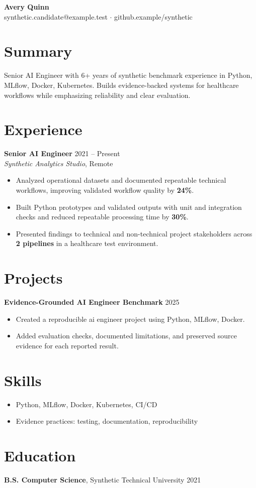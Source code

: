 \documentclass[10pt,letterpaper]{article}
\begin{document}
\begin{center}
{\Large \textbf{Avery Quinn}}\\
synthetic.candidate@example.test $\cdot$ github.example/synthetic
\end{center}

\section*{Summary}
Senior AI Engineer with 6+ years of synthetic benchmark experience in Python, MLflow, Docker, Kubernetes. Builds evidence-backed systems for healthcare workflows while emphasizing reliability and clear evaluation.

\section*{Experience}
\textbf{Senior AI Engineer} \hfill 2021 -- Present\\
\textit{Synthetic Analytics Studio}, Remote
\begin{itemize}
  \item Analyzed operational datasets and documented repeatable technical workflows, improving validated workflow quality by \textbf{24\%}.
  \item Built Python prototypes and validated outputs with unit and integration checks and reduced repeatable processing time by \textbf{30\%}.
  \item Presented findings to technical and non-technical project stakeholders across \textbf{2 pipelines} in a healthcare test environment.
\end{itemize}

\section*{Projects}
\textbf{Evidence-Grounded AI Engineer Benchmark} \hfill 2025
\begin{itemize}
  \item Created a reproducible ai engineer project using Python, MLflow, Docker.
  \item Added evaluation checks, documented limitations, and preserved source evidence for each reported result.
\end{itemize}

\section*{Skills}
\begin{itemize}
  \item Python, MLflow, Docker, Kubernetes, CI/CD
  \item Evidence practices: testing, documentation, reproducibility
\end{itemize}

\section*{Education}
\textbf{B.S. Computer Science}, Synthetic Technical University \hfill 2021
\end{document}
